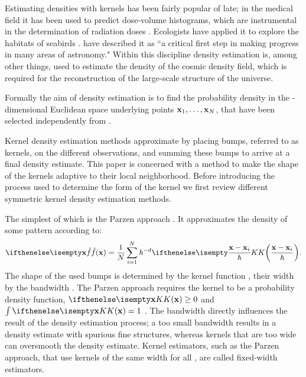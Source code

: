 Estimating densities with kernels has been fairly popular of late; in the medical field it has been used to predict dose-volume histograms, which are instrumental in the determination of radiation doses \cite{SkarpmanDose2015}. Ecologists have applied it to explore the habitats of seabirds \cite{lees2016using}. \textcite{ferdosi2011comparison} have described it as ``a critical first step in making progress in many areas of astronomy."  Within this discipline  density estimation is, among other things, used to estimate the density of the cosmic density field, which is required for the reconstruction of the large-scale structure of the universe.

Formally the aim of density estimation is to find the probability density \varDensityFunction{\varPattern} in the \varDim-dimensional Euclidean space underlying \varNumPatterns points $\varPattern[1], \dotsc, \varPattern[\varNumPatterns]$, that have been selected independently from \varDensityFunction{\varPattern}. 

Kernel density estimation methods approximate \varDensityFunction{\varPattern} by placing bumps, referred to as kernels, on the different observations, and summing these bumps to arrive at a final density estimate. This paper is concerned with a method to make the shape of the kernels adaptive to their local neighborhood. Before introducing the process used to determine the form of the kernel we first review different symmetric kernel density estimation methods.

	The simplest of which is the Parzen approach \cite{parzen1962estimation}. It approximates the density of some pattern \varPattern according to:
	\begin{equation}\label{eq:1:parzen}
		\varEstimatedDensityFunction{\varPattern} = \frac{1}{\varNumPatterns}\sum_{\itXis = 1}^{\varNumPatterns} \varBandwidth^{-\varDim}\varKernel{\frac{\varPattern - \varPattern[\itXis]}{\varBandwidth}}.
	\end{equation}
	The shape of the used bumps is determined by the kernel function \varKernel{\bullet}, their width by the bandwidth \varBandwidth. The Parzen approach requires the kernel to be a probability density function, \ie $\varKernel{\varPattern} \geq 0$ and $\int \varKernel{\varPattern} = 1$ \cite{silverman1986density}. 
	The bandwidth directly influences the result of the density estimation process; a too small bandwidth results in a density estimate with spurious fine structures, whereas kernels that are too wide can oversmooth the density estimate. Kernel estimators, such as the Parzen approach, that use kernels of the same width for all \varPattern[\itXis], are called fixed-width estimators.

